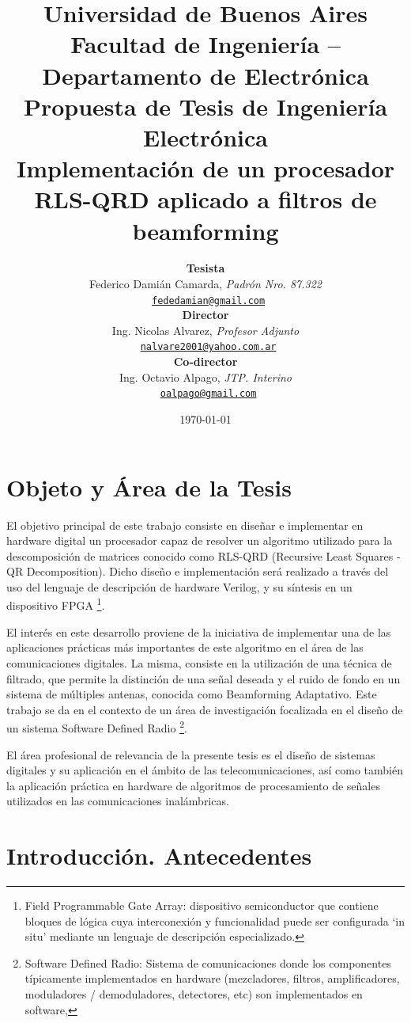 \documentclass[a4paper]{article}
\title{
	{\normalsize
		Universidad de Buenos Aires\\
		Facultad de Ingeniería -- Departamento de Electrónica\\
		Propuesta de Tesis de Ingeniería Electrónica\\
		\vspace{0.7cm}
	}
	Implementación de un procesador RLS-QRD aplicado a filtros de beamforming
}
\author{	\textbf{Tesista}															\\
			Federico Damián Camarda, \textit{Padrón Nro. 87.322}               			\\
            \texttt{ \href{mailto:fededamian@mail.com}{fededamian@gmail.com}}			\\[2.5ex]
            \textbf{Director}																\\
            Ing. Nicolas Alvarez, \textit{Profesor Adjunto}             				\\
            \texttt{ \href{mailto:nalvare2001@yahoo.com.ar}{nalvare2001@yahoo.com.ar}}  \\[2.5ex]
            \textbf{Co-director}															\\
            Ing. Octavio Alpago, \textit{JTP. Interino}               					\\
            \texttt{ \href{mailto:oalpago@gmail.com}{oalpago@gmail.com}}                \\[2.5ex]
       }
\date{\today}
\begin{document}
\maketitle



\thispagestyle{fancy}

\section{Objeto y Área de la Tesis}

El objetivo principal de este trabajo consiste en diseñar e implementar en hardware digital un procesador capaz de resolver un algoritmo utilizado para la descomposición de matrices conocido como RLS-QRD (Recursive Least Squares - QR Decomposition). Dicho diseño e implementación será realizado a través del uso del lenguaje de descripción de hardware Verilog, y su síntesis en un dispositivo FPGA \footnote{\label{FPGA}Field Programmable Gate Array: dispositivo semiconductor que contiene bloques de lógica cuya interconexión y funcionalidad puede ser configurada `in situ' mediante un lenguaje de descripción especializado.}.

El interés en este desarrollo proviene de la iniciativa de implementar una de las aplicaciones prácticas más importantes de este algoritmo en el área de las comunicaciones digitales. La misma, consiste en la utilización de una técnica de filtrado, que permite la distinción de una señal deseada y el ruido de fondo en un sistema de múltiples antenas, conocida como Beamforming Adaptativo. Este trabajo se da en el contexto de un área de investigación focalizada en el diseño de un sistema Software Defined Radio \footnote{\label{SDR}Software Defined Radio: Sistema de comunicaciones donde los componentes típicamente implementados en hardware (mezcladores, filtros, amplificadores, moduladores / demoduladores, detectores, etc) son implementados en software,}.

El área profesional de relevancia de la presente tesis es el diseño de sistemas digitales y su aplicación en el ámbito de las telecomunicaciones, así como también la aplicación práctica en hardware de algoritmos de procesamiento de señales utilizados en las comunicaciones inalámbricas.

\newpage

\section{Introducción. Antecedentes}
\end{document}
